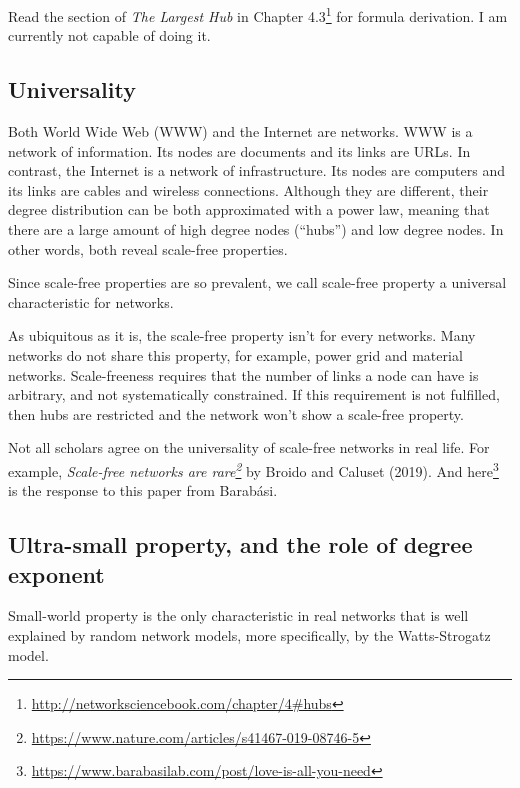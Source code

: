 \documentclass[
]{krantz}
\makeatletter
\renewcommand{\href}[2]{#2\footnote{\url{#1}}}
\newenvironment{kframe}{%
\medskip{}
\setlength{\fboxsep}{.8em}
 \def\at@end@of@kframe{}%
 \ifinner\ifhmode%
  \def\at@end@of@kframe{\end{minipage}}%
  \begin{minipage}{\columnwidth}%
 \fi\fi%
 \def\FrameCommand##1{\hskip\@totalleftmargin \hskip-\fboxsep
 \colorbox{shadecolor}{##1}\hskip-\fboxsep
     \hskip-\linewidth \hskip-\@totalleftmargin \hskip\columnwidth}%
 \MakeFramed {\advance\hsize-\width
   \@totalleftmargin\z@ \linewidth\hsize
   \@setminipage}}%
 {\par\unskip\endMakeFramed%
 \at@end@of@kframe}
\newenvironment{rmdblock}[1]
  {
  \begin{itemize}
  \renewcommand{\labelitemi}{
    \raisebox{-.7\height}[0pt][0pt]{
      {\setkeys{Gin}{width=3em,keepaspectratio}\texttt{[image: images/\#1]}}
    }
  }
  \setlength{\fboxsep}{1em}
  \begin{kframe}
  \item
  }
  {
  \end{kframe}
  \end{itemize}
  }
\newenvironment{rmdimportant}
  {\begin{rmdblock}{important}}
  {\end{rmdblock}}
\makeatother
\begin{document}
Read the section of \emph{The Largest Hub} in \href{http://networksciencebook.com/chapter/4\#hubs}{Chapter 4.3} for formula derivation. I am currently not capable of doing it.

\hypertarget{universality}{%
\subsection{Universality}\label{universality}}

Both World Wide Web (WWW) and the Internet are networks. WWW is a network of information. Its nodes are documents and its links are URLs. In contrast, the Internet is a network of infrastructure. Its nodes are computers and its links are cables and wireless connections. Although they are different, their degree distribution can be both approximated with a power law, meaning that there are a large amount of high degree nodes (``hubs'') and low degree nodes. In other words, both reveal scale-free properties.

Since scale-free properties are so prevalent, we call scale-free property a universal characteristic for networks.

As ubiquitous as it is, the scale-free property isn't for every networks. Many networks do not share this property, for example, power grid and material networks. Scale-freeness requires that the number of links a node can have is arbitrary, and not systematically constrained. If this requirement is not fulfilled, then hubs are restricted and the network won't show a scale-free property.

\begin{rmdimportant}
Not all scholars agree on the universality of scale-free networks in real life. For example, \emph{\href{https://www.nature.com/articles/s41467-019-08746-5}{Scale-free networks are rare}} by Broido and Caluset (2019). And \href{https://www.barabasilab.com/post/love-is-all-you-need}{here} is the response to this paper from Barabási.
\end{rmdimportant}

\hypertarget{ultra-small-property-and-the-role-of-degree-exponent}{%
\subsection{Ultra-small property, and the role of degree exponent}\label{ultra-small-property-and-the-role-of-degree-exponent}}

Small-world property is the only characteristic in real networks that is well explained by random network models, more specifically, by the Watts-Strogatz model.
\end{document}
